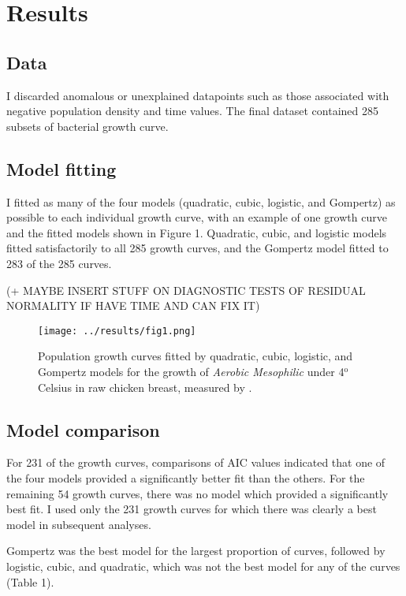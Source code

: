 \documentclass[11pt]{article}
\newcommand{\supersc}[1]{\ensuremath{^{\textrm{#1}}}}
\begin{document}
	
	
	\section{Results}
	
	\subsection{Data}
	
	I discarded anomalous or unexplained datapoints such as those associated with negative population density and time values. The final dataset contained 285 subsets of bacterial growth curve.
	
	
	\subsection{Model fitting}
	
	I fitted as many of the four models (quadratic, cubic, logistic, and Gompertz) as possible to each individual growth curve, with an example of one growth curve and the fitted models shown in Figure 1. Quadratic, cubic, and logistic models fitted satisfactorily to all 285 growth curves, and the Gompertz model fitted to 283 of the 285 curves.  
	
	(+ MAYBE INSERT STUFF ON DIAGNOSTIC TESTS OF RESIDUAL NORMALITY IF HAVE TIME AND CAN FIX IT)
	
	\begin{figure}[htbp]
		\centering
		\texttt{[image: ../results/fig1.png]}
		\caption{Population growth curves fitted by quadratic, cubic, logistic, and Gompertz models for the growth of \textit{Aerobic Mesophilic} under 4\supersc{o} Celsius in raw chicken breast, measured by \cite{bae2014growth}.}
		\label{fig1}
	\end{figure}
	
	
	\subsection{Model comparison}
	
	For 231 of the growth curves, comparisons of AIC values indicated that one of the four models provided a significantly better fit than the others. For the remaining 54 growth curves, there was no model which provided a significantly best fit. I used only the 231 growth curves for which there was clearly a best model in subsequent analyses. 
	
	Gompertz was the best model for the largest proportion of curves, followed by logistic, cubic, and quadratic, which was not the best model for any of the curves (Table 1).
\end{document}
